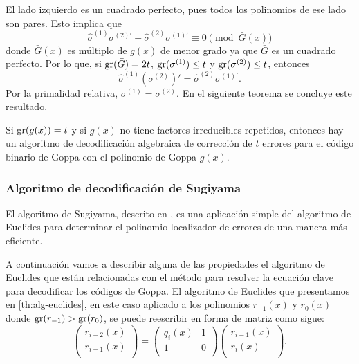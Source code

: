 El lado izquierdo es un cuadrado perfecto, pues todos los polinomios de ese lado son pares. Esto implica que
\[
    \hat{\sigma}^{(1)} \sigma^{(2)'} + \hat{\sigma}^{(2)} \sigma^{(1)'} \equiv 0 \pmod{\bar{G}(x)}
\]
donde $\bar{G}(x)$ es múltiplo de $g(x)$ de menor grado ya que $\bar{G}$ es un cuadrado perfecto. Por lo que, si $\operatorname{gr}(\bar{G}) = 2t$, $\operatorname{gr}(\sigma^{(1)}) \leq t$ y $\operatorname{gr}(\sigma^{(2)}) \leq t$, entonces 
\[
    \hat{\sigma}^{(1)} \left( \sigma^{(2)} \right) ' = \hat{\sigma}^{(2)} \sigma^{(1)'}.
\]
Por la primalidad relativa, $\sigma^{(1)} = \sigma^{(2)}$. En el siguiente teorema se concluye este resultado.

\begin{theorem}
    Si $\operatorname{gr}(g(x)) = t$ y si $g(x)$ no tiene factores irreducibles repetidos, entonces hay un algoritmo de decodificación algebraica de corrección de $t$ errores para el código binario de Goppa con el polinomio de Goppa $g(x)$.
\end{theorem}

\subsubsection{Algoritmo de decodificación de Sugiyama}

El algoritmo de Sugiyama, descrito en \cite{Sugiyama_1975}, es una aplicación simple del algoritmo de Euclides para determinar el polinomio localizador de errores de una manera más eficiente.

A continuación vamos a describir alguna de las propiedades el algoritmo de Euclides que están relacionadas con el método para resolver la ecuación clave para decodificar los códigos de Goppa. El algoritmo de Euclides que presentamos en \ref{th:alg-euclides}, en este caso aplicado a los polinomios $r_{-1}(x)$ y $r_0(x)$ donde $\operatorname{gr}(r_{-1}) > \operatorname{gr}(r_0)$, se puede reescribir en forma de matriz como sigue:
\begin{equation}
    \label{alg:euclides-matriz}
    \left( 
        \begin{array}{c}  
            r_{i-2}(x) \\
            r_{i-1}(x) \\
        \end{array} 
    \right)
    = 
    \left( 
        \begin{array}{cc}  
            q_{i}(x) & 1 \\
            1 & 0 \\
        \end{array} 
    \right)
    \left( 
        \begin{array}{c}  
            r_{i-1}(x) \\
            r_{i}(x) \\
        \end{array} 
    \right).
\end{equation}

